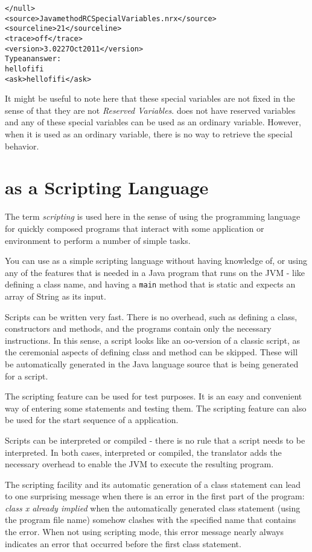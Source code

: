 {\begin{alltt}
</null>
<source>Java method RCSpecialVariables.nrx</source>
<sourceline>21</sourceline>
<trace>off</trace>
<version>\nr{} 3.02 27 Oct 2011</version>
Type an answer:
hello fifi
<ask>hello fifi</ask>
\end{alltt}
It might be useful to note here that these special variables are not
fixed in the sense of that they are not \emph{Reserved Variables}. \nr{}
does not have reserved variables and any of these special variables
can be used as an ordinary variable. However, when it is used as an
ordinary variable, there is no way to retrieve the special behavior.
\chapter{\nr{} as a Scripting Language}
The term \emph{scripting} is used here in the sense of using the
programming language for quickly composed programs that interact with
some application or environment to perform a number of simple tasks.

You can use \nr{} as a simple scripting language without having
knowledge of, or using any of the features that is needed in a Java
program that runs on the JVM - like defining a class name, and having
a \texttt{main} method that is static and expects an array of String
as its input. 

Scripts can be written very fast. There is
no overhead, such as defining a class, constructors and methods, and the programs contain only
the necessary instructions. In this sense, a \nr{} script looks like
an oo-version of a classic script, as the ceremonial aspects of defining
class and method can be skipped. These will be automatically generated
in the Java language source that is being generated for a script.

The scripting feature can be used for test purposes. It is an easy and convenient way of entering some statements and testing them.
The scripting feature can also be used for the start sequence of a \nr{} application.

Scripts can be interpreted or compiled - there is no rule that a
script needs to be interpreted. In both cases, interpreted or
compiled, the \nr{} translator adds the necessary overhead to enable
the JVM to execute the resulting program.

The scripting facility and its automatic generation of a class
statement can lead to one surprising message when there is
an error in the first part of the program: \emph{class x already
  implied} when the automatically generated class statement (using the
program file name) somehow clashes with the specified name that
contains the error. When not using scripting mode, this error message
nearly always indicates an error that occurred before the first class statement.

}
